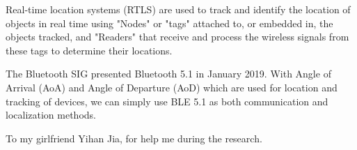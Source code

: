 \documentclass[sigconf]{acmart}
\begin{document}
Real-time location systems (RTLS) are used to track and identify the location of objects in real time using "Nodes" or "tags" attached to, or embedded in, the objects tracked, and "Readers" that receive and process the wireless signals from these tags to determine their locations.\cite{costs2009real}

The Bluetooth SIG presented Bluetooth 5.1 in January 2019. With Angle of Arrival (AoA) and Angle of Departure (AoD) which are used for location and tracking of devices, we can simply use BLE 5.1 as both communication and localization methods.

\begin{acks}
To my girlfriend Yihan Jia, for help me during the research.
\end{acks}




\end{document}
